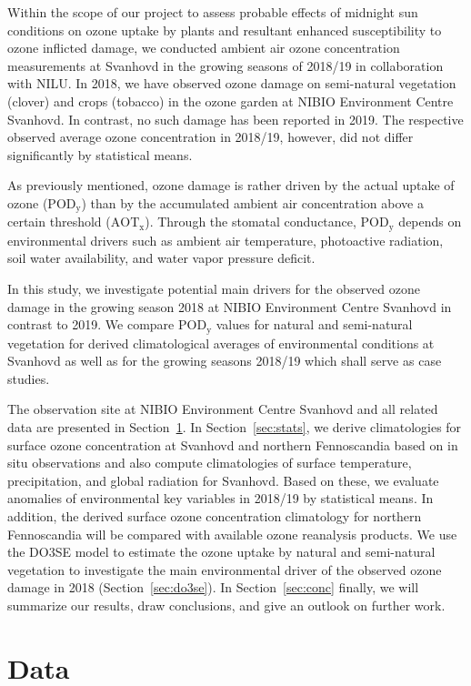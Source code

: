 \documentclass[bg, manuscript]{copernicus}
\begin{document}
Within the scope of our project to assess probable effects of midnight sun conditions on ozone uptake by plants and resultant enhanced susceptibility to ozone inflicted damage, we conducted ambient air ozone concentration measurements at Svanhovd in the growing seasons of 2018/19 in collaboration with NILU. 
In 2018, we have observed ozone damage on semi-natural vegetation (clover) and crops (tobacco) in the ozone garden at NIBIO Environment Centre Svanhovd. In contrast, no such damage has been reported in 2019.
The respective observed average ozone concentration in 2018/19, however, did not differ significantly by statistical means.

As previously mentioned, ozone damage is rather driven by the actual uptake of ozone ($\mathrm{POD_y}$) than by the accumulated ambient air concentration above a certain threshold ($\mathrm{AOT_x}$). Through the stomatal conductance, $\mathrm{POD_y}$ depends on environmental drivers such as ambient air temperature, photoactive radiation, soil water availability, and water vapor pressure deficit.

In this study, we investigate potential main drivers for the observed ozone damage in the growing season 2018 at NIBIO Environment Centre Svanhovd in contrast to 2019. We compare $\mathrm{POD_y}$ values for natural and semi-natural vegetation for derived climatological averages of environmental conditions at Svanhovd as well as for the growing seasons 2018/19 which shall serve as case studies.

The observation site at NIBIO Environment Centre Svanhovd and all related data are presented in Section~\ref{sec:data}. In Section~\ref{sec:stats}, we derive climatologies for surface ozone concentration at Svanhovd and northern Fennoscandia based on in situ observations and also compute climatologies of surface temperature, precipitation, and global radiation for Svanhovd. Based on these, we evaluate anomalies of environmental key variables in 2018/19 by statistical means. In addition, the derived surface ozone concentration climatology for northern Fennoscandia will be compared with available ozone reanalysis products. We use the DO3SE model to estimate the ozone uptake by natural and semi-natural vegetation to investigate the main environmental driver of the observed ozone damage in 2018 (Section~\ref{sec:do3se}). In Section~\ref{sec:conc} finally, we will summarize our results, draw conclusions, and give an outlook on further work.


\section{Data}
\label{sec:data}
\end{document}
